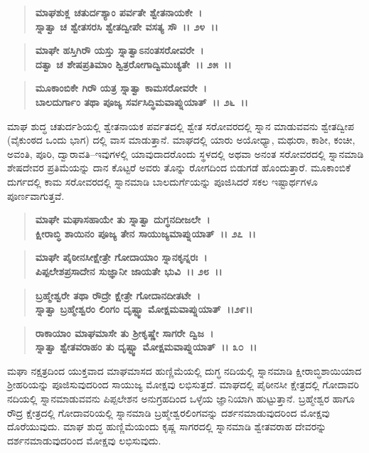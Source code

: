 \begin{verse}
\textbf{ಮಾಘಶುಕ್ಲ ಚತುರ್ದಶ್ಯಾಂ ಪರ್ವತೇ ಶ್ವೇತನಾಯಕೇ~।}\\\textbf{ಸ್ನಾತ್ವಾ ಚ ಶ್ವೇತಸರಸಿ ಶ್ವೇತದ್ವೀಪೇ ವಸತ್ಯ ಸೌ~।। ೨೪~।। }
\end{verse}

\begin{verse}
\textbf{ಮಾಘೇ ಹಸ್ತಿಗಿ‌ರೌ ಯಸ್ತು ಸ್ನಾತ್ವಾಽನಂತಸರೋವರೇ~।}\\\textbf{ದತ್ವಾ ಚ ಶೇಷಪ್ರತಿಮಾಂ ಶ್ವಿತ್ರರೋಗಾದ್ವಿಮುಚ್ಯತೇ~।। ೨೫~।।}
\end{verse}

\begin{verse}
\textbf{ಮೂಕಾಂಬಿಕೇ ಗಿರೌ‌ ಯತ್ರ ಸ್ನಾತ್ವಾ ಕಾಮಸರೋವರೇ~।}\\\textbf{ಬಾಲದುರ್ಗಾಂ ತಥಾ ಪೂಜ್ಯ ಸರ್ವಸಿದ್ಧಿಮವಾಪ್ನುಯಾತ್~।। ೨೬~।।}
\end{verse}

ಮಾಘ ಶುದ್ಧ ಚತುರ್ದಶಿಯಲ್ಲಿ ಶ್ವೇತನಾಯಕ ಪರ್ವತದಲ್ಲಿ ಶ್ವೇತ ಸರೋವರದಲ್ಲಿ ಸ್ನಾನ ಮಾಡುವವನು ಶ್ವೇತದ್ವೀಪ (ವೈಕುಂಠದ ಒಂದು ಭಾಗ) ದಲ್ಲಿ ವಾಸ ಮಾಡುತ್ತಾನೆ. ಮಾಘದಲ್ಲಿ ಯಾರು ಅಯೋಧ್ಯಾ, ಮಥುರಾ, ಕಾಶೀ, ಕಂಚೀ, ಅವಂತಿ, ಪೂರಿ, ದ್ವಾರಾವತಿ–ಇವುಗಳಲ್ಲಿ ಯಾವುದಾದರೊಂದು ಸ್ಥಳದಲ್ಲಿ ಅಥವಾ ಅನಂತ ಸರೋವರದಲ್ಲಿ ಸ್ನಾನಮಾಡಿ ಶೇಷದೇವರ ಪ್ರತಿಮೆಯನ್ನು ದಾನ ಕೊಟ್ಟರೆ ಅವರು ತೊನ್ನು ರೋಗದಿಂದ ಬಿಡುಗಡೆ ಹೊಂದುತ್ತಾರೆ. ಮೂಕಾಂಬಿಕೆ ದುರ್ಗದಲ್ಲಿ ಕಾಮ ಸರೋವರದಲ್ಲಿ ಸ್ನಾನಮಾಡಿ ಬಾಲದುರ್ಗೆಯನ್ನು ಪೂಜಿಸಿದರೆ ಸಕಲ ಇಷ್ಟಾರ್ಥಗಳೂ ಪೂರ್ಣವಾಗುತ್ತವೆ.

\begin{verse}
\textbf{ಮಾಘೇ ಮಘಾಸಹಾಯೇ ತು ಸ್ನಾತ್ವಾ ದುಗ್ಧನದೀಜಲೇ~।}\\\textbf{ಕ್ಷೀರಾಬ್ಧಿ ಶಾಯಿನಂ ಪೂಜ್ಯ ತೇನ ಸಾಯುಜ್ಯಮಾಪ್ನುಯಾತ್~।। ೨೭~।।}
\end{verse}

\begin{verse}
\textbf{ಮಾಘೇ ಪೈಠೀನಸೀಕ್ಷೇತ್ರೇ ಗೋದಾಯಾಂ ಸ್ನಾನಕೃನ್ನರಃ~।}\\\textbf{ಪಿಪ್ಪಲೇಶಪ್ರಸಾದೇನ ಸುಜ್ಞಾನೀ ಜಾಯತೇ ಭುವಿ~।। ೨೮~।। }
\end{verse}

\begin{verse}
\textbf{ಬ್ರಹ್ಮೇಶ್ವರೇ ತಥಾ ರೌದ್ರೇ ಕ್ಷೇತ್ರೇ ಗೋದಾನದೀತಟೇ~।}\\\textbf{ಸ್ನಾತ್ವಾ ಬ್ರಹ್ಮೇಶ್ವರಂ ಲಿಂಗಂ ದೃಷ್ಟ್ವಾ ಮೋಕ್ಷಮವಾಪ್ನುಯಾತ್~।।೨೯।।} 
\end{verse}

\begin{verse}
\textbf{ರಾಕಾಯಾಂ ಮಾಘಮಾಸೇ ತು ಶ‍್ರೀಕೃಷ್ಣೇ ಸಾಗರೇ ದ್ವಿಜ~।}\\\textbf{ಸ್ನಾತ್ವಾ ಶ್ವೇತವರಾಹಂ ತು ದೃಷ್ಟ್ವಾ ಮೋಕ್ಷಮವಾಪ್ನುಯಾತ್~।। ೩೦~।।}
\end{verse}

ಮಘಾ ನಕ್ಷತ್ರದಿಂದ ಯುಕ್ತವಾದ ಮಾಘಮಾಸದ ಹುಣ್ಣಿಮೆಯಲ್ಲಿ ದುಗ್ಧ ನದಿಯಲ್ಲಿ ಸ್ನಾನಮಾಡಿ ಕ್ಷೀರಾಬ್ಧಿಶಾಯಿಯಾದ ಶ‍್ರೀಹರಿಯನ್ನು ಪೂಜಿಸುವುದರಿಂದ ಸಾಯುಜ್ಯ ಮೋಕ್ಷವು ಲಭಿಸುತ್ತದೆ. ಮಾಘದಲ್ಲಿ ಪೈಠೀನಸೀ ಕ್ಷೇತ್ರದಲ್ಲಿ ಗೋದಾವರಿ ನದಿಯಲ್ಲಿ ಸ್ನಾನಮಾಡುವವನು ಪಿಪ್ಪಲೇಶನ ಅನುಗ್ರಹದಿಂದ ಒಳ್ಳೆಯ ಜ್ಞಾನಿಯಾಗಿ ಹುಟ್ಟುತ್ತಾನೆ. ಬ್ರಹ್ಮೇಶ್ವರ ಹಾಗೂ ರೌದ್ರ ಕ್ಷೇತ್ರದಲ್ಲಿ ಗೋದಾವರಿಯಲ್ಲಿ ಸ್ನಾನಮಾಡಿ ಬ್ರಹ್ಮೇಶ್ವರಲಿಂಗವನ್ನು ದರ್ಶನಮಾಡುವುದರಿಂದ ಮೋಕ್ಷವು ದೊರೆಯುವುದು. ಮಾಘ ಶುದ್ಧ ಹುಣ್ಣಿಮೆಯಂದು ಕೃಷ್ಣ ಸಾಗರದಲ್ಲಿ ಸ್ನಾನಮಾಡಿ ಶ್ವೇತವರಾಹ ದೇವರನ್ನು ದರ್ಶನಮಾಡುವುದರಿಂದ ಮೋಕ್ಷವು ಲಭಿಸುವುದು.

